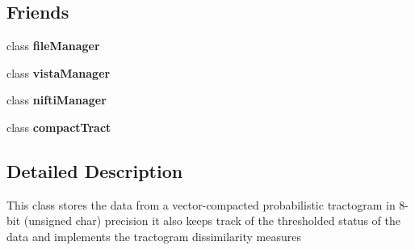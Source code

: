 \subsection*{\-Friends}
\begin{DoxyCompactItemize}
\item 
\hypertarget{classcompactTractChar_a7ea7d52c87a9299a8dad891be045a681}{class {\bfseries file\-Manager}}\label{classcompactTractChar_a7ea7d52c87a9299a8dad891be045a681}

\item 
\hypertarget{classcompactTractChar_a9314384ea65b036521db3749c607fac4}{class {\bfseries vista\-Manager}}\label{classcompactTractChar_a9314384ea65b036521db3749c607fac4}

\item 
\hypertarget{classcompactTractChar_abdbb08f5306829a91e8cbf995fa8a06d}{class {\bfseries nifti\-Manager}}\label{classcompactTractChar_abdbb08f5306829a91e8cbf995fa8a06d}

\item 
\hypertarget{classcompactTractChar_a48a6d650a3d6663f7c05bfc1e3eb480e}{class {\bfseries compact\-Tract}}\label{classcompactTractChar_a48a6d650a3d6663f7c05bfc1e3eb480e}

\end{DoxyCompactItemize}


\subsection{\-Detailed \-Description}
\-This class stores the data from a vector-\/compacted probabilistic tractogram in 8-\/bit (unsigned char) precision it also keeps track of the thresholded status of the data and implements the tractogram dissimilarity measures 

